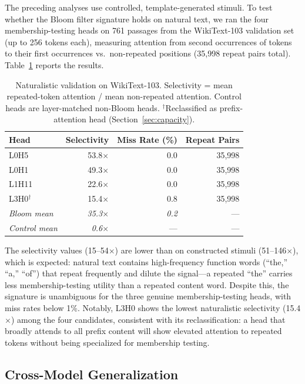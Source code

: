 \documentclass[11pt]{article}
\begin{document}
The preceding analyses use controlled, template-generated stimuli. To test whether the Bloom filter signature holds on natural text, we ran the four membership-testing heads on 761 passages from the WikiText-103 validation set (up to 256 tokens each), measuring attention from second occurrences of tokens to their first occurrences vs.\ non-repeated positions (35,998 repeat pairs total). Table~\ref{tab:naturalistic} reports the results.

\begin{table}[h]
\centering
\caption{Naturalistic validation on WikiText-103. Selectivity = mean repeated-token attention / mean non-repeated attention. Control heads are layer-matched non-Bloom heads. $^\dagger$Reclassified as prefix-attention head (Section~\ref{sec:capacity}).}
\label{tab:naturalistic}
\small
\begin{tabular}{lrrr}
\toprule
Head & Selectivity & Miss Rate (\%) & Repeat Pairs \\
\midrule
L0H5 & 53.8$\times$ & 0.0 & 35,998 \\
L0H1 & 49.3$\times$ & 0.0 & 35,998 \\
L1H11 & 22.6$\times$ & 0.0 & 35,998 \\
L3H0$^\dagger$ & 15.4$\times$ & 0.8 & 35,998 \\
\midrule
\textit{Bloom mean} & \textit{35.3$\times$} & \textit{0.2} & --- \\
\textit{Control mean} & \textit{0.6$\times$} & --- & --- \\
\bottomrule
\end{tabular}
\end{table}

The selectivity values (15--54$\times$) are lower than on constructed stimuli (51--146$\times$), which is expected: natural text contains high-frequency function words (``the,'' ``a,'' ``of'') that repeat frequently and dilute the signal---a repeated ``the'' carries less membership-testing utility than a repeated content word. Despite this, the signature is unambiguous for the three genuine membership-testing heads, with miss rates below 1\%. Notably, L3H0 shows the lowest naturalistic selectivity (15.4$\times$) among the four candidates, consistent with its reclassification: a head that broadly attends to all prefix content will show elevated attention to repeated tokens without being specialized for membership testing.

\subsection{Cross-Model Generalization}
\label{sec:crossmodel}
\end{document}
